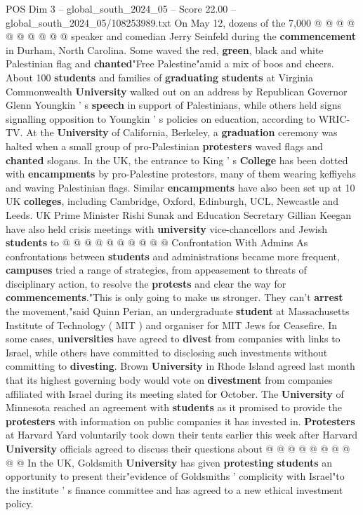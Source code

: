 \begin{textsample}{POS Dim 3 – global\_south\_2024\_05 – Score 22.00 – global\_south\_2024\_05/108253989.txt}
On May 12, dozens of the 7,000 @ @ @ @ @ @ @ @ @ @ speaker and comedian Jerry Seinfeld during the \textbf{commencement} in Durham, North Carolina.
Some waved the red, \textbf{green}, black and white Palestinian flag and \textbf{chanted}"Free Palestine"amid a mix of boos and cheers.
About 100 \textbf{students} and families of \textbf{graduating} \textbf{students} at Virginia Commonwealth \textbf{University} walked out on an address by Republican Governor Glenn Youngkin ' s \textbf{speech} in support of Palestinians, while others held signs signalling opposition to Youngkin ' s policies on education, according to WRIC-TV.
At the \textbf{University} of California, Berkeley, a \textbf{graduation} ceremony was halted when a small group of pro-Palestinian \textbf{protesters} waved flags and \textbf{chanted} slogans.
In the UK, the entrance to King ' s \textbf{College} has been dotted with \textbf{encampments} by pro-Palestine protestors, many of them wearing keffiyehs and waving Palestinian flags.
Similar \textbf{encampments} have also been set up at 10 UK \textbf{colleges}, including Cambridge, Oxford, Edinburgh, UCL, Newcastle and Leeds.
UK Prime Minister Rishi Sunak and Education Secretary Gillian Keegan have also held crisis meetings with \textbf{university} vice-chancellors and Jewish \textbf{students} to @ @ @ @ @ @ @ @ @ @ Confrontation With Admins As confrontations between \textbf{students} and administrations became more frequent, \textbf{campuses} tried a range of strategies, from appeasement to threats of disciplinary action, to resolve the \textbf{protests} and clear the way for \textbf{commencements}."This is only going to make us stronger.
They can't \textbf{arrest} the movement,"said Quinn Perian, an undergraduate \textbf{student} at Massachusetts Institute of Technology ( MIT ) and organiser for MIT Jews for Ceasefire.
In some cases, \textbf{universities} have agreed to \textbf{divest} from companies with links to Israel, while others have committed to disclosing such investments without committing to \textbf{divesting}.
Brown \textbf{University} in Rhode Island agreed last month that its highest governing body would vote on \textbf{divestment} from companies affiliated with Israel during its meeting slated for October.
The \textbf{University} of Minnesota reached an agreement with \textbf{students} as it promised to provide the \textbf{protesters} with information on public companies it has invested in. \textbf{Protesters} at Harvard Yard voluntarily took down their tents earlier this week after Harvard \textbf{University} officials agreed to discuss their questions about @ @ @ @ @ @ @ @ @ @ In the UK, Goldsmith \textbf{University} has given \textbf{protesting} \textbf{students} an opportunity to present their"evidence of Goldsmiths ' complicity with Israel"to the institute ' s finance committee and has agreed to a new ethical investment policy.

\end{textsample}
